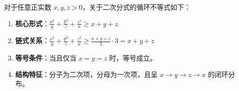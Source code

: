 \begin{statementbox}
对于任意正实数 $x, y, z > 0$，关于二次分式的循环不等式如下：
\begin{enumerate}
    \item \textbf{核心形式}：$\frac{x^2}{y} + \frac{y^2}{z} + \frac{z^2}{x} \geqslant x+y+z$
    \item \textbf{链式关系}：$\frac{x^2}{y} + \frac{y^2}{z} + \frac{z^2}{x} \geqslant \frac{x+y+z}{3} \cdot 3 = x+y+z$
    \item \textbf{等号条件}：当且仅当 $x = y = z$ 时，等号成立。
    \item \textbf{结构特征}：分子为二次项，分母为一次项，且呈 $x \to y \to z \to x$ 的闭环分布。
\end{enumerate}
\end{statementbox}